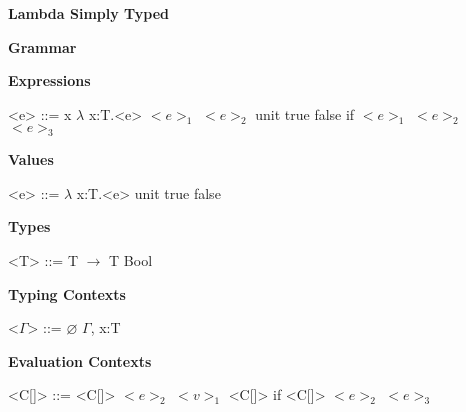 \documentclass[11pt,oneside]{book}
\begin{document}
\frontmatter

\mainmatter

\pagebreak

\begin{center}
    {
        \bf
        \huge
        Lambda Simply Typed
    }
\end{center}

\begin{center}
{
    \bf
    \huge
    Grammar
}
\end{center}


\setlength{\grammarindent}{10em} %

\setlength{\grammarparsep}{5pt} %

\textbf{Expressions}

\begin{grammar}

    <e> ::=  x
        \alt $\lambda$ x:T.<e>
        \alt $<e>_1$ $<e>_2$
        \alt unit
        \alt true
        \alt false
        \alt if $<e>_1$ $<e>_2$ $<e>_3$

\end{grammar}

\textbf{Values}

\begin{grammar}

    <e> ::=  $\lambda$ x:T.<e>
        \alt unit
        \alt true
        \alt false

\end{grammar}

\textbf{Types}

\begin{grammar}

    <T> ::= T $\rightarrow$ T
        \alt Bool

\end{grammar}

\textbf{Typing Contexts}

\begin{grammar}

    <$\Gamma$> ::=  $\varnothing$
               \alt $\Gamma$, x:T

\end{grammar}

\textbf{Evaluation Contexts}

\begin{grammar}

    <C[\textbullet]> ::=  \textbullet
                     \alt <C[\textbullet]> $<e>_2$
                     \alt $<v>_1$ <C[\textbullet]>
                     \alt if <C[\textbullet]> $<e>_2$ $<e>_3$
\end{grammar}
\end{document}
